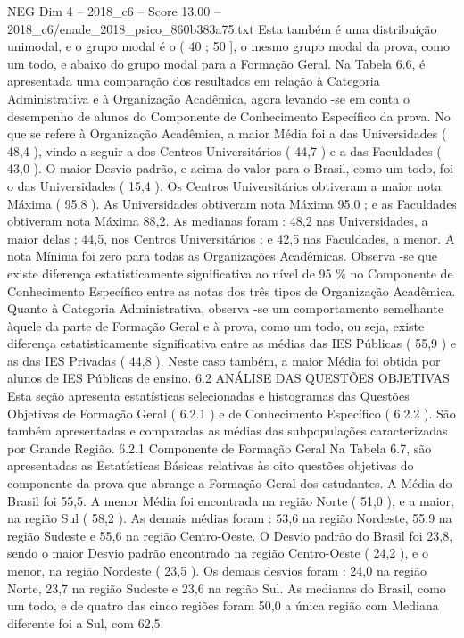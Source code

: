 \begin{textsample}{NEG Dim 4 – 2018\_c6 – Score 13.00 – 2018\_c6/enade\_2018\_psico\_860b383a75.txt}
Esta também é uma distribuição unimodal, e o grupo modal é o ( 40 ; 50 ], o mesmo grupo modal da prova, como um todo, e abaixo do grupo modal para a Formação Geral.
Na Tabela 6.6, é apresentada uma comparação dos resultados em relação à Categoria Administrativa e à Organização Acadêmica, agora levando -se em conta o desempenho de alunos do Componente de Conhecimento Específico da prova.
No que se refere à Organização Acadêmica, a maior Média foi a das Universidades ( 48,4 ), vindo a seguir a dos Centros Universitários ( 44,7 ) e a das Faculdades ( 43,0 ).
O maior Desvio padrão, e acima do valor para o Brasil, como um todo, foi o das Universidades ( 15,4 ).
Os Centros Universitários obtiveram a maior nota Máxima ( 95,8 ).
As Universidades obtiveram nota Máxima 95,0 ; e as Faculdades obtiveram nota Máxima 88,2.
As medianas foram : 48,2 nas Universidades, a maior delas ; 44,5, nos Centros Universitários ; e 42,5 nas Faculdades, a menor.
A nota Mínima foi zero para todas as Organizações Acadêmicas.
Observa -se que existe diferença estatisticamente significativa ao nível de 95 \% no Componente de Conhecimento Específico entre as notas dos três tipos de Organização Acadêmica.
Quanto à Categoria Administrativa, observa -se um comportamento semelhante àquele da parte de Formação Geral e à prova, como um todo, ou seja, existe diferença estatisticamente significativa entre as médias das IES Públicas ( 55,9 ) e as das IES Privadas ( 44,8 ).
Neste caso também, a maior Média foi obtida por alunos de IES Públicas de ensino. 6.2 ANÁLISE DAS QUESTÕES OBJETIVAS Esta seção apresenta estatísticas selecionadas e histogramas das Questões Objetivas de Formação Geral ( 6.2.1 ) e de Conhecimento Específico ( 6.2.2 ).
São também apresentadas e comparadas as médias das subpopulações caracterizadas por Grande Região. 6.2.1 Componente de Formação Geral Na Tabela 6.7, são apresentadas as Estatísticas Básicas relativas às oito questões objetivas do componente da prova que abrange a Formação Geral dos estudantes.
A Média do Brasil foi 55,5.
A menor Média foi encontrada na região Norte ( 51,0 ), e a maior, na região Sul ( 58,2 ).
As demais médias foram : 53,6 na região Nordeste, 55,9 na região Sudeste e 55,6 na região Centro-Oeste.
O Desvio padrão do Brasil foi 23,8, sendo o maior Desvio padrão encontrado na região Centro-Oeste ( 24,2 ), e o menor, na região Nordeste ( 23,5 ).
Os demais desvios foram : 24,0 na região Norte, 23,7 na região Sudeste e 23,6 na região Sul.
As medianas do Brasil, como um todo, e de quatro das cinco regiões foram 50,0 a única região com Mediana diferente foi a Sul, com 62,5.

\end{textsample}
